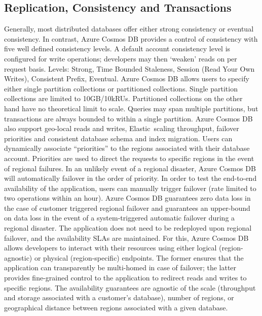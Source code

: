 \subsection{Replication, Consistency and Transactions}
Generally, most distributed databases offer either strong consistency
or eventual consistency. In contrast, Azure Cosmos DB provides a
control of consistency with five well defined consistency levels. A
default account consistency level is configured for write operations;
developers may then ‘weaken’ reads on per request basis. Levels:
Strong, Time Bounded Staleness, Session (Read Your Own Writes),
Consistent Prefix, Eventual.  Azure Cosmos DB allows users to specify
either single partition collections or partitioned collections. Single
partition collections are limited to 10GB/10kRUs. Partitioned
collections on the other hand have no theoretical limit to
scale. Queries may span multiple partitions, but transactions are
always bounded to within a single partition.  Azure Cosmos DB also
support geo-local reads and writes, Elastic scaling throughput,
failover priorities and consistent database schema and index
migration.  Users can dynamically associate “priorities” to the
regions associated with their database account. Priorities are used to
direct the requests to specific regions in the event of regional
failures. In an unlikely event of a regional disaster, Azure Cosmos DB
will automatically failover in the order of priority. In order to test
the end-to-end availability of the application, users can manually
trigger failover (rate limited to two operations within an
hour). Azure Cosmos DB guarantees zero data loss in the case of
customer triggered regional failover and guarantees an upper-bound on
data loss in the event of a system-triggered automatic failover during
a regional disaster. The application does not need to be redeployed
upon regional failover, and the availability SLAs are maintained. For
this, Azure Cosmos DB allows developers to interact with their
resources using either logical (region-agnostic) or physical
(region-specific) endpoints. The former ensures that the application
can transparently be multi-homed in case of failover; the latter
provides fine-grained control to the application to redirect reads and
writes to specific regions. The availability guarantees are agnostic
of the scale (throughput and storage associated with a customer’s
database), number of regions, or geographical distance between regions
associated with a given database.

